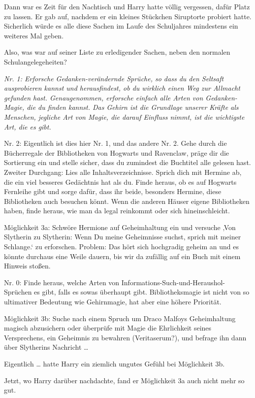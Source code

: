 {Dann war es Zeit für den Nachtisch und Harry hatte völlig vergessen, dafür Platz zu lassen. Er gab auf, nachdem er ein kleines Stückchen Siruptorte probiert hatte. Sicherlich würde es alle diese Sachen im Laufe des Schuljahres mindestens ein weiteres Mal geben.

Also, was war auf seiner Liste zu erledigender Sachen, neben den normalen Schulangelegeheiten?

\emph{Nr. 1: Erforsche Gedanken-verändernde Sprüche, so dass du den Seltsaft ausprobieren kannst und herausfindest, ob du wirklich einen Weg zur Allmacht gefunden hast. Genaugenommen, erforsche einfach alle Arten von Gedanken-Magie, die du finden kannst. Das Gehirn ist die Grundlage unserer Kräfte als Menschen, jegliche Art von Magie, die darauf Einfluss nimmt, ist die wichtigste Art, die es gibt.}

Nr. 2: Eigentlich ist dies hier Nr. 1, und das andere Nr. 2. Gehe durch die Bücherregale der Bibliotheken von Hogwarts und Ravenclaw, präge dir die Sortierung ein und stelle sicher, dass du zumindest die Buchtitel alle gelesen hast. Zweiter Durchgang: Lies alle Inhaltsverzeichnisse. Sprich dich mit Hermine ab, die ein viel besseres Gedächtnis hat als du. Finde heraus, ob es auf Hogwarts Fernleihe gibt und sorge dafür, dass ihr beide, besonders Hermine, diese Bibliotheken auch besuchen könnt. Wenn die anderen Häuser eigene Bibliotheken haben, finde heraus, wie man da legal reinkommt oder sich hineinschleicht.

Möglichkeit 3a: Schwöre Hermione auf Geheimhaltung ein und versuche ‚Von Slytherin zu Slytherin: Wenn Du meine Geheimnisse suchst, sprich mit meiner Schlange.` zu erforschen. Problem: Das hört sich hochgradig geheim an und es könnte durchaus eine Weile dauern, bis wir da zufällig auf ein Buch mit einem Hinweis stoßen.

Nr. 0: Finde heraus, welche Arten von Informations-Such-und-Heraushol-Sprüchen es gibt, falls es sowas überhaupt gibt. Bibliotheksmagie ist nicht von so ultimativer Bedeutung wie Gehirnmagie, hat aber eine höhere Priorität.

Möglichkeit 3b: Suche nach einem Spruch um Draco Malfoys Geheimhaltung magisch abzusichern oder überprüfe mit Magie die Ehrlichkeit seines Versprechens, ein Geheimnis zu bewahren (Veritaserum?), und befrage ihn dann über Slytherins Nachricht …

Eigentlich … hatte Harry ein ziemlich ungutes Gefühl bei Möglichkeit 3b.

Jetzt, wo Harry darüber nachdachte, fand er Möglichkeit 3a auch nicht mehr so gut.

}
